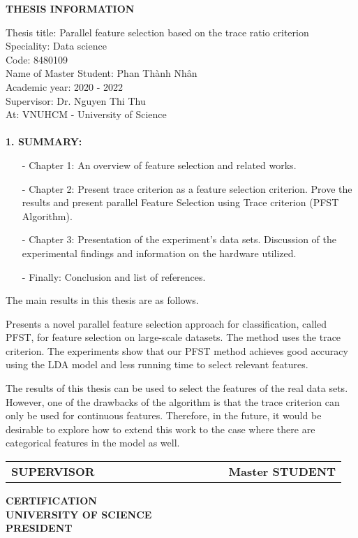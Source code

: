 \thispagestyle{empty}
\begin{center}
	\LARGE{\textbf{THESIS INFORMATION}}
\end{center}

\noindent Thesis title: Parallel feature selection based on the trace ratio criterion
\\
Speciality: Data science
\\
Code:  8480109
\\
Name of Master Student: Phan Thành Nhân
\\
Academic year: 2020 - 2022
\\
Supervisor:  Dr. Nguyen Thi Thu
\\
At: VNUHCM - University of Science\\
\\
{\bf 1. SUMMARY:}
\begin{itemize}
	\item[-] Chapter 1: An overview of feature selection and related works.
	\item[-] Chapter 2: Present trace criterion as a feature selection criterion. Prove the results and present parallel Feature Selection  using  Trace  criterion (PFST Algorithm).
	\item[-] Chapter 3: Presentation of the experiment's data sets. Discussion of the experimental findings and information on the hardware utilized.
        \item[-] Finally: Conclusion and list of references.
\end{itemize}

  The main results in this thesis are as follows. 

Presents a novel parallel feature selection approach for classification, called PFST, for feature selection on large-scale datasets. The method uses the trace criterion. The experiments show that our PFST method achieves good accuracy using the LDA model and less running time to select relevant features.


The results of this thesis can be used to select the features of the real data sets. However, one of the drawbacks of the algorithm is that the trace criterion can only be used for continuous features. Therefore, in the future, it would be desirable to explore how to extend this work to the case where there are categorical features in the model as well.
\newpage

\begin{center}
\begin{tabular}{ccccccccccccc}
	{\bf SUPERVISOR}	&&&&&&&&&&&& {\bf Master STUDENT} \\
\end{tabular}
\end{center}

\vspace{3cm}

\begin{center}
	{\bf CERTIFICATION}\\ 
	{\bf UNIVERSITY OF SCIENCE}\\
	{\bf PRESIDENT}
\end{center}
\thispagestyle{empty}